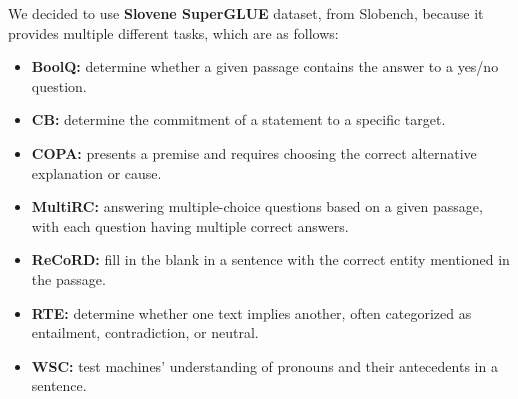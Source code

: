 \documentclass[fleqn,moreauthors,10pt]{ds_report}
\begin{document}
    We decided to use \textbf{Slovene SuperGLUE} dataset, from Slobench, because it provides multiple different tasks, which are as follows:
    \begin{itemize}
        \item \textbf{BoolQ:} determine whether a given passage contains the answer to a yes/no question.
        \item \textbf{CB:} determine the commitment of a statement to a specific target.
        \item \textbf{COPA:} presents a premise and requires choosing the correct alternative explanation or cause.
        \item \textbf{MultiRC:} answering multiple-choice questions based on a given passage, with each question having multiple correct answers.
        \item \textbf{ReCoRD:} fill in the blank in a sentence with the correct entity mentioned in the passage.
        \item \textbf{RTE:} determine whether one text implies another, often categorized as entailment, contradiction, or neutral.
        \item \textbf{WSC:} test machines' understanding of pronouns and their antecedents in a sentence.
     \end{itemize}
    
    
    
\end{document}

